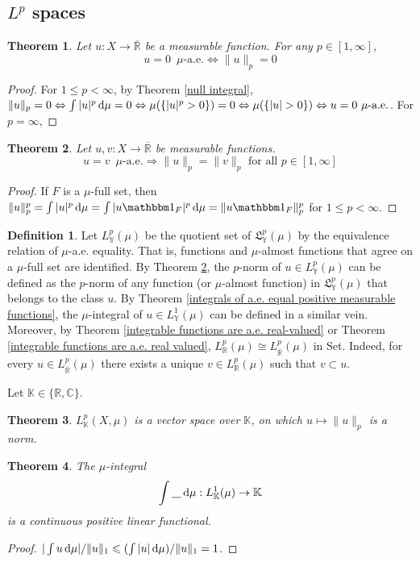 \documentclass[11pt, a4paper, openany]{book}
\newtheorem{thm}{Theorem}\newtheorem{lem}{Lemma}\newtheorem{crl}{Corollary}
\theoremstyle{definition}
\newtheorem{define}{Definition}\newtheorem{exam}{Example}\newtheorem{remark}{Remark}
\newcommand{\ph}{\underline{\hspace{0.3cm}}}
\newcommand{\cat}[1]{\textup{\textsf{#1}}}
\newcommand{\er}{\overline{\mathbb{R}}}
\begin{document}
\subsection{\texorpdfstring{$L^p$}{Lp} spaces}
    \begin{thm}
        Let $u:X\rightarrow \er$ be a measurable function. For any $p\in [1,\infty]$,
        \[
            u=0\,\,\, \mu\text{-a.e.}\Longleftrightarrow \|u\|_p=0
        \]
    \end{thm}
    \begin{proof}
        For $1\leqslant p<\infty$, by Theorem \ref{null integral}, $\|u\|_p=0\Leftrightarrow \int |u|^p\odif\mu=0\Leftrightarrow \mu(\{|u|^p>0\})=0\Leftrightarrow \mu(\{|u|>0\})\Leftrightarrow u=0\,\,\mu\text{-a.e.}$. For $p=\infty$, 
    \end{proof}
    \begin{thm}\label{u=v almost everywhere}
        Let $u,v:X\rightarrow \er$ be measurable functions.
        \[
            u=v\,\,\,\mu\text{-a.e.}\Longrightarrow \|u\|_p=\|v\|_p \text{ for all }p\in [1,\infty]
        \]
    \end{thm}
    \begin{proof}
        If $F$ is a $\mu$-full set, then $\|u\|_p^p=\int |u|^p\odif\mu=\int |u\one_F|^p\odif\mu=\|u\one_F\|_p^p$ for $1\leqslant p<\infty$.
    \end{proof}
    \begin{define}
        Let $L^p_{\mathbb{Y}}(\mu)$ be the quotient set of $\mathfrak{L}^p_{\mathbb{Y}}(\mu)$ by the equivalence relation of $\mu$-a.e. equality. That is, functions and $\mu$-almost functions that agree on a $\mu$-full set are identified. By Theorem \ref{u=v almost everywhere}, the $p$-norm of $u\in L^p_{\mathbb{Y}}(\mu)$ can be defined as the $p$-norm of any function (or $\mu$-almost function) in $\mathfrak{L}^p_{\mathbb{Y}}(\mu)$ that belongs to the class $u$. By Theorem \ref{integrals of a.e. equal positive measurable functions}, the $\mu$-integral of $u\in L^1_\mathbb{Y}(\mu)$ can be defined in a similar vein. Moreover, by Theorem \ref{integrable functions are a.e. real-valued} or Theorem \ref{integrable functions are a.e. real valued}, $L^p_\mathbb{R}(\mu)\cong L^p_{\er}(\mu)$ in \cat{Set}. Indeed, for every $u\in L^p_{\er}(\mu)$ there exists a unique $v\in L^p_\mathbb{R}(\mu)$ such that $v\subset u$.
    \end{define}
    Let $\mathbb{K}\in\{\mathbb{R},\mathbb{C}\}$.
    \begin{thm}
        $L_\mathbb{K}^p(X,\mu)$ is a vector space over $\mathbb{K}$, on which $u\mapsto \|u\|_p$ is a norm.
    \end{thm}
    \begin{thm}
        The $\mu$-integral
        \[
            \int \ph\odif \mu:L^1_\mathbb{K}(\mu)\rightarrow \mathbb{K}
        \]
        is a continuous positive linear functional.
    \end{thm}
    \begin{proof}
        $|\int u\odif\mu|/\|u\|_1\leqslant (\int |u|\odif\mu)/\|u\|_1=1$.
    \end{proof}
\end{document}
